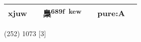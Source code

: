 \documentclass[14pt,a4paper]{scrartcl}
\begin{document}
\begin{longtable}[c]{@{}llllll@{}}
\begin{minipage}[t]{0.14\columnwidth}
xjuw
\strut\end{minipage} &
\begin{minipage}[t]{0.14\columnwidth}\raggedright\strut
\strut\end{minipage} &
\begin{minipage}[t]{0.14\columnwidth}\raggedright\strut
梟\textsuperscript{689f~kew}
\strut\end{minipage} &
\begin{minipage}[t]{0.14\columnwidth}\raggedright\strut
\strut\end{minipage} &
\begin{minipage}[t]{0.14\columnwidth}\raggedright\strut
pure:A
\strut\end{minipage}\tabularnewline
\bottomrule
\end{longtable}

(252) 1073 {[}3{]}
\end{document}
